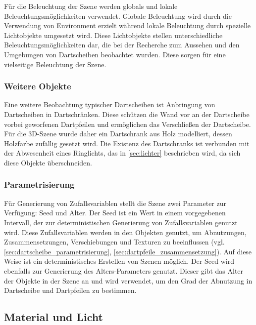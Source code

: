 Für die Beleuchtung der Szene werden globals und lokale Beleuchtungsmöglichkeiten verwendet. Globale Beleuchtung wird durch die Verwendung von Environment erzielt während lokale Beleuchtung durch spezielle Lichtobjekte umgesetzt wird. Diese Lichtobjekte stellen unterschiedliche Beleuchtungsmöglichkeiten dar, die bei der Recherche zum Aussehen und den Umgebungen von Dartscheiben beobachtet wurden. Diese sorgen für eine vielseitige Beleuchtung der Szene.

\subsubsection{Weitere Objekte}
\label{sec:weitere_objekte}

Eine weitere Beobachtung typischer Dartscheiben ist Anbringung von Dartscheiben in Dartschränken. Diese schützen die Wand vor an der Dartscheibe vorbei geworfenen Dartpfeilen und ermöglichen das Verschließen der Dartscheibe. Für die 3D-Szene wurde daher ein Dartschrank aus Holz modelliert, dessen Holzfarbe zufällig gesetzt wird. Die Existenz des Dartschranks ist verbunden mit der Abwesenheit eines Ringlichts, das in \autoref{sec:lichter} beschrieben wird, da sich diese Objekte überschneiden.

\subsubsection{Parametrisierung}
\label{sec:parameter}

Für Generierung von Zufallsvariablen stellt die Szene zwei Parameter zur Verfügung: Seed und Alter. Der Seed ist ein Wert in einem vorgegebenen Intervall, der zur deterministischen Generierung von Zufallsvariablen genutzt wird. Diese Zufallsvariablen werden in den Objekten genutzt, um Abnutzungen, Zusammensetzungen, Verschiebungen und Texturen zu beeinflussen (vgl. \autoref{sec:dartscheibe_parametrisierung}, \autoref{sec:dartpfeile_zusammensetzung}). Auf diese Weise ist ein deterministisches Erstellen von Szenen möglich. Der Seed wird ebenfalls zur Generierung des Alters-Parameters genutzt. Dieser gibt das Alter der Objekte in der Szene an und wird verwendet, um den Grad der Abnutzung in Dartscheibe und Dartpfeilen zu bestimmen.


\subsection{Material und Licht}  %
\label{sec:material_licht}

